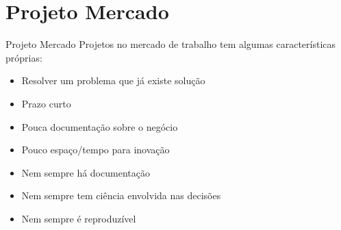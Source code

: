 \section{Projeto Mercado}

\begin{frame}
	\begin{block}{Projeto Mercado}
		Projetos no mercado de trabalho tem algumas características próprias:
		\begin{itemize}
			\item Resolver um problema que já existe solução
			\item Prazo curto
			\item Pouca documentação sobre o negócio
			\item Pouco espaço/tempo para inovação
			\item Nem sempre há documentação
			\item Nem sempre tem ciência envolvida nas decisões
			\item Nem sempre é reproduzível
		\end{itemize}
	\end{block}
\end{frame}
